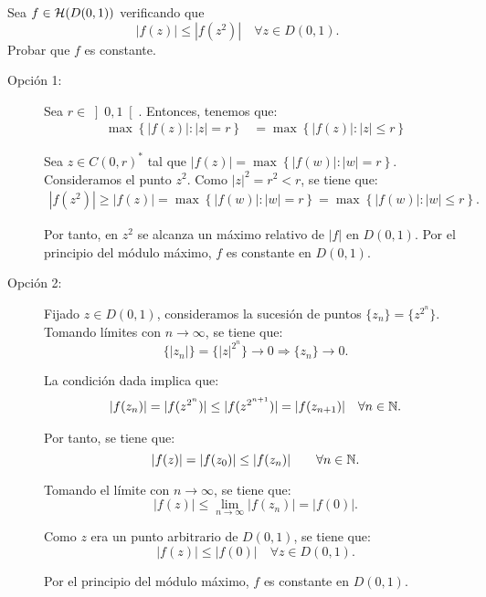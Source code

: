 \begin{ejercicio}
    Sea $f\in \mathcal{H}(D(0,1))$ verificando que
    \begin{equation*}
        |f(z)| \leq |f(z^2)| \quad \forall z\in D(0,1).
    \end{equation*}
    Probar que $f$ es constante.
    \begin{description}
        \item[Opción 1:] Sea $r\in \left]0,1\right[$. Entonces, tenemos que:
        \begin{align*}
            \max\left\{ |f(z)| : |z| = r \right\} &= \max\left\{ |f(z)| : |z|\leq r \right\}
        \end{align*}

        Sea $z\in C(0,r)^*$ tal que $|f(z)| = \max\left\{ |f(w)| : |w| = r \right\}$. Consideramos el punto $z^2$. Como $|z|^2 = r^2 < r$, se tiene que:
        \begin{align*}
            |f(z^2)| \geq |f(z)| = \max\left\{ |f(w)| : |w| = r \right\}
            = \max\left\{ |f(w)| : |w|\leq r \right\}.
        \end{align*}

        Por tanto, en $z^2$ se alcanza un máximo relativo de $|f|$ en $D(0,1)$. Por el principio del módulo máximo, $f$ es constante en $D(0,1)$.

        \item[Opción 2:] Fijado $z\in D(0,1)$, consideramos la sucesión de puntos $\{z_n\}=\{z^{2^n}\}$. Tomando límites con $n\to \infty$, se tiene que:
        \begin{equation*}
            \{|z_n|\} = \{ |z|^{2^n} \} \to 0
            \Longrightarrow
            \{z_n\} \to 0.
        \end{equation*}

        La condición dada implica que:
        \begin{align*}
            |f(z_n)| = |f(z^{2^n})| \leq |f(z^{2^{n+1}})| = |f(z_{n+1})| \quad \forall n\in \mathbb{N}.
        \end{align*}

        Por tanto, se tiene que:
        \begin{equation*}
            |f(z)| = |f(z_0)| \leq |f(z_n)| \qquad \forall n\in \mathbb{N}.
        \end{equation*}

        Tomando el límite con $n\to \infty$, se tiene que:
        \begin{equation*}
            |f(z)| \leq \lim_{n\to \infty} |f(z_n)| = |f(0)|.
        \end{equation*}

        Como $z$ era un punto arbitrario de $D(0,1)$, se tiene que:
        \begin{equation*}
            |f(z)| \leq |f(0)| \quad \forall z\in D(0,1).
        \end{equation*}

        Por el principio del módulo máximo, $f$ es constante en $D(0,1)$.
    \end{description}
\end{ejercicio}

